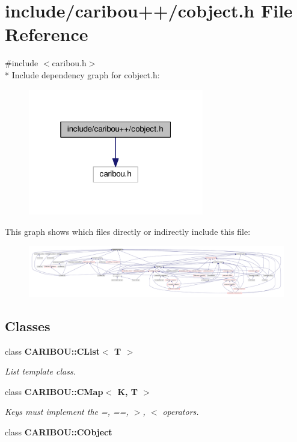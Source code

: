 \section{include/caribou++/cobject.h File Reference}
\label{cobject_8h}
{\ttfamily \#include $<$caribou.\+h$>$}\\*
Include dependency graph for cobject.\+h\+:
\nopagebreak
\begin{figure}[H]
\begin{center}
\leavevmode
\includegraphics[width=217pt]{cobject_8h__incl}
\end{center}
\end{figure}
This graph shows which files directly or indirectly include this file\+:
\nopagebreak
\begin{figure}[H]
\begin{center}
\leavevmode
\includegraphics[width=350pt]{cobject_8h__dep__incl}
\end{center}
\end{figure}
\subsection*{Classes}
\begin{DoxyCompactItemize}
\item 
class {\bf C\+A\+R\+I\+B\+O\+U\+::\+C\+List$<$ T $>$}
\begin{DoxyCompactList}\small\item\em List template class. \end{DoxyCompactList}\item 
class {\bf C\+A\+R\+I\+B\+O\+U\+::\+C\+Map$<$ K, T $>$}
\begin{DoxyCompactList}\small\item\em Keys must implement the =, ==, $>$, $<$ operators. \end{DoxyCompactList}\item 
class {\bf C\+A\+R\+I\+B\+O\+U\+::\+C\+Object}
\end{DoxyCompactItemize}
